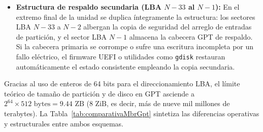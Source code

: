 \documentclass[12pt]{article}
\begin{document}
\begin{itemize}[noitemsep, topsep=2pt]
\begin{itemize}[noitemsep]
        \item GUID único de partición (\textit{Unique Partition GUID} o PARTUUID, 16 bytes): identificador aleatorio asignado de manera irrepetible a la partición específica.
        \item LBA de inicio y LBA de fin (8 bytes cada uno, enteros de 64 bits): permite referenciar sectores hasta $2^{64}$.
        \item Atributos de partición (8 bytes): banderas de 64 bits para marcar atributos como volumen de solo lectura, oculto o de arranque del sistema.
        \item Nombre de la partición (72 bytes): cadena de hasta 36 caracteres codificada en UTF-16LE, permitiendo etiquetar los volúmenes directamente en la tabla.
    \end{itemize}
    \item \textbf{Estructura de respaldo secundaria (LBA $N-33$ al $N-1$):} En el extremo final de la unidad se duplica íntegramente la estructura: los sectores LBA $N-33$ a $N-2$ albergan la copia de seguridad del arreglo de entradas de partición, y el sector LBA $N-1$ almacena la cabecera GPT de respaldo. Si la cabecera primaria se corrompe o sufre una escritura incompleta por un fallo eléctrico, el firmware UEFI o utilidades como \texttt{gdisk} restauran automáticamente el estado consistente empleando la copia secundaria.
\end{itemize}

Gracias al uso de enteros de 64 bits para el direccionamiento LBA, el límite teórico de tamaño de partición y de disco en GPT asciende a $2^{64} \times 512\text{ bytes} = 9.44\text{ ZB}$ ($8\text{ ZiB}$, es decir, más de nueve mil millones de terabytes). La Tabla~\ref{tab:comparativaMbrGpt} sintetiza las diferencias operativas y estructurales entre ambos esquemas.
\end{document}
